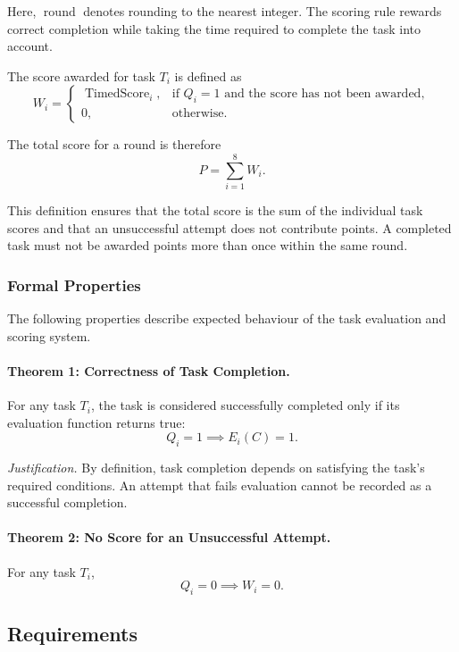 \documentclass[12pt]{article}
\begin{document}
Here, \(\operatorname{round}\) denotes rounding to the nearest
integer. The scoring rule rewards correct completion while taking
the time required to complete the task into account.

The score awarded for task \(T_i\) is defined as
\[
    W_i =
    \begin{cases}
        \operatorname{TimedScore}_i,
        & \text{if } Q_i = 1 \text{ and the score has not been awarded},\\
        0, & \text{otherwise}.
    \end{cases}
\]

The total score for a round is therefore
\[
    P = \sum_{i=1}^{8} W_i.
\]

This definition ensures that the total score is the sum of the
individual task scores and that an unsuccessful attempt does not
contribute points. A completed task must not be awarded points
more than once within the same round.

\subsubsection{Formal Properties}

The following properties describe expected behaviour of the task
evaluation and scoring system.

\paragraph{Theorem 1: Correctness of Task Completion.}

For any task \(T_i\), the task is considered successfully completed
only if its evaluation function returns true:
\[
    Q_i = 1 \implies E_i(C) = 1.
\]

\textit{Justification.}
By definition, task completion depends on satisfying the task's
required conditions. An attempt that fails evaluation cannot be
recorded as a successful completion.

\paragraph{Theorem 2: No Score for an Unsuccessful Attempt.}

For any task \(T_i\),
\[
    Q_i = 0 \implies W_i = 0.
\]

\subsection{Requirements}
 
\end{document}
